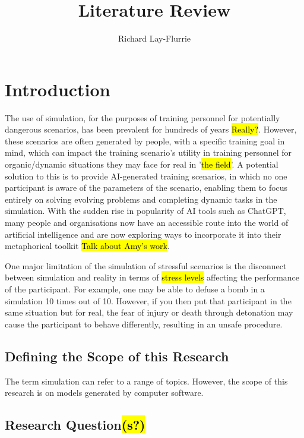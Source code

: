 \documentclass{article}
\title{Literature Review}
\author{Richard Lay-Flurrie}
\begin{document}
\maketitle

\tableofcontents



\section{Introduction}

The use of simulation, for the purposes of training personnel for potentially dangerous scenarios, has been prevalent for hundreds of years \hl{Really?}. However, these scenarios are often generated by people, with a specific training goal in mind, which can impact the training scenario's utility in training personnel for organic/dynamic situations they may face for real in '\hl{the field}'. A potential solution to this is to provide AI-generated training scenarios, in which no one participant is aware of the parameters of the scenario, enabling them to focus entirely on solving evolving problems and completing dynamic tasks in the simulation. With the sudden rise in popularity of AI tools such as ChatGPT, many people and organisations now have an accessible route into the world of artificial intelligence and are now exploring ways to incorporate it into their metaphorical toolkit \hl{Talk about Amy's work}. 

One major limitation of the simulation of stressful scenarios is the disconnect between simulation and reality in terms of \hl{stress levels} affecting the performance of the participant. For example, one may be able to defuse a bomb in a simulation 10 times out of 10. However, if you then put that participant in the same situation but for real, the fear of injury or death through detonation may cause the participant to behave differently, resulting in an unsafe procedure.

\subsection{Defining the Scope of this Research}

The term simulation can refer to a range of topics. However, the scope of this research is on models generated by computer software.

\subsection{Research Question\hl{(s?)}}
\end{document}
